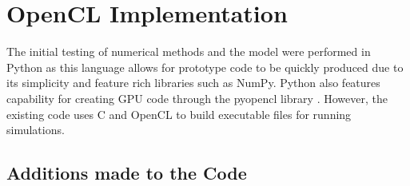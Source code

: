\documentclass[../Interim_Report_Master]{subfiles}
\begin{document}
\hypertarget{op_imp}{\section{OpenCL Implementation}\label{op_imp}}
The initial testing of numerical methods and the model were performed in Python as this language allows for prototype code to be quickly produced due to its simplicity and feature rich libraries such as NumPy. Python also features capability for creating GPU code through the pyopencl library \cite{pyopencl}. However, the existing code uses C and OpenCL to build executable files for running simulations. 

\subsection{Additions made to the Code}
\end{document}
